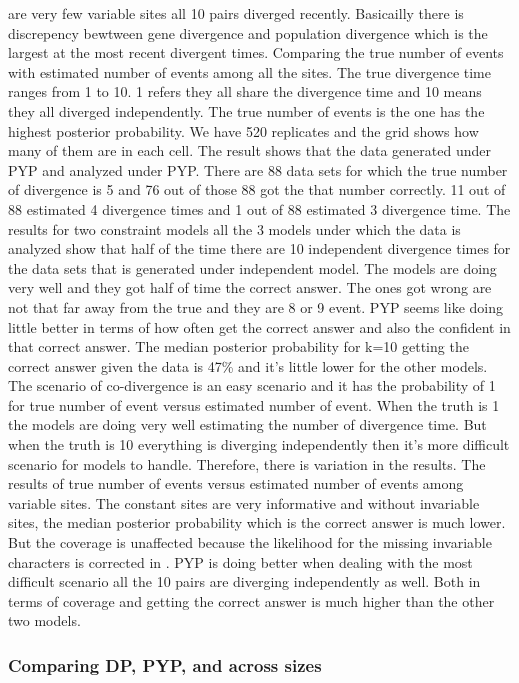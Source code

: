 \documentclass[letterpaper,12pt]{article}
\begin{document}
are very few variable sites all 10 pairs diverged recently. Basicailly there is discrepency bewtween 
gene divergence and population divergence which is the largest at the most recent divergent times.
Comparing the true number of events with estimated number of events among all the sites. The true 
divergence time ranges from 1 to 10.  1 refers they all share the divergence time and 10 means they all 
diverged independently. The true number of events is the one has the highest posterior probability.
We have 520 replicates and the grid shows how many of them are in each cell. The result shows 
that the data generated under PYP and analyzed under PYP. There are 88 data sets for which the true 
number of divergence is 5 and 76 out of those 88 got the that number correctly. 11 out of 88 
estimated 4 divergence times and 1 out of 88 estimated 3 divergence time. 
The results for two constraint models all the 3 models under which the data is analyzed show that 
half of the time there are 10 independent divergence times for the data sets that is generated under 
independent model. The models are doing very well and they got half of time the correct answer. The 
ones got wrong are not that far away from the true and they are 8 or 9 event. PYP seems like 
doing little better in terms of how often get the correct answer and also the confident in that 
correct answer. The median posterior probability for k=10 getting the correct answer
given the data is 47\% and it's little lower for the other models. The scenario of co-divergence
is an easy scenario and it has the probability of 1 for true number of event versus estimated number of 
event. When the truth is 1 the models are doing very well estimating the number of divergence time. But 
when the truth is 10 everything is diverging independently then it's more difficult scenario for 
models to handle. Therefore, there is variation in the results. 
The results of true number of events versus estimated number of events among variable sites. The
constant sites are very informative and without invariable sites, the median posterior probability
which is the correct answer is much lower. But the coverage is unaffected because the 
likelihood for the missing invariable characters is corrected in \Ecoevolity. PYP is doing better when 
dealing with the most difficult scenario all the 10 pairs are diverging independently as well. Both in
terms of coverage and getting the correct answer is much higher than the other two models. 

\subsubsection{Comparing DP, PYP, and \wunif across \dataset sizes}
\end{document}
